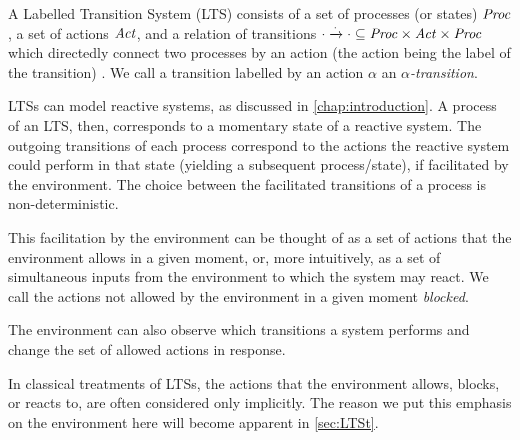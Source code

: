 %
\begin{isabellebody}%
%
%
\isadelimtheory
%
\endisadelimtheory
%
\isatagtheory
%
\endisatagtheory
{\isafoldtheory}%
%
\isadelimtheory
%
\endisadelimtheory
%
\isadelimdocument
%
\endisadelimdocument
%
\isatagdocument
%
\isamarkuptrue%
%
\endisatagdocument
{\isafolddocument}%
%
\isadelimdocument
%
\endisadelimdocument
%
\begin{isamarkuptext}%
\label{sec:LTS}%
\end{isamarkuptext}\isamarkuptrue%
%
\begin{isamarkuptext}%
A Labelled Transition System (LTS) consists of a set of processes (or states) $\mathit{Proc}$, a set of actions $\mathit{Act}$, and a relation of transitions $\cdot\xrightarrow{\cdot}\cdot \subseteq \mathit{Proc}\times\mathit{Act}\times\mathit{Proc}$ which directedly connect two processes by an action (the action being the label of the transition) \cite{resyst}. We call a transition labelled by an action $\alpha$ an \emph{$\alpha$-transition}.

LTSs can model reactive systems, as discussed in \cref{chap:introduction}. A process of an LTS, then, corresponds to a momentary state of a reactive system. The outgoing transitions of each process correspond to the actions the reactive system could perform in that state (yielding a subsequent process/state), if facilitated by the environment. The choice between the facilitated transitions of a process is non-deterministic.

This facilitation by the environment can be thought of as a set of actions that the environment allows in a given moment, or, more intuitively, as a set of simultaneous inputs from the environment to which the system may react. We call the actions not allowed by the environment in a given moment \emph{blocked}.

The environment can also observe which transitions a system performs and change the set of allowed actions in response.

In classical treatments of LTSs, the actions that the environment allows, blocks, or reacts to, are often considered only implicitly. The reason we put this emphasis on the environment here will become apparent in \cref{sec:LTSt}.

\end{isamarkuptext}
\end{isabellebody}
